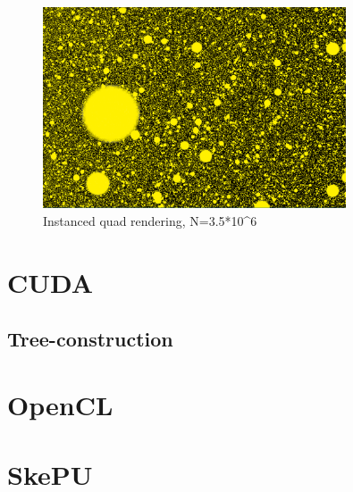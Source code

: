\begin{figure}[!htpb]
    \centering
    \includegraphics[width=0.8\textwidth]{Method/Figs/OpenGLVis_N=3500000.png}
    \caption{Instanced quad rendering, N=3.5*10^6}
    \label{fig:OpenGLEarlyVis}
\end{figure}


\section{CUDA}

\subsection{Tree-construction}

\section{OpenCL}

\section{SkePU}

